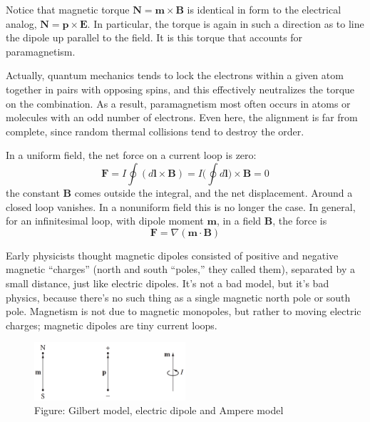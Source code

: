 \documentclass[../../../main.tex]{subfiles}
\begin{document}
Notice that magnetic torque $ \mathbf{N}=\mathbf{m}\times\mathbf{B}$ is identical in form to the electrical analog, $\mathbf{N} = \mathbf{p} \times \mathbf{E}$. In particular, the torque is again in such a direction as to line the dipole up parallel to the ﬁeld. It is this torque that accounts for paramagnetism.

Actually, quantum mechanics tends to lock the electrons within a given atom together in pairs with opposing spins, and this effectively neutralizes the torque on the combination. As a result, paramagnetism most often occurs in atoms or molecules with an odd number of electrons. Even here, the alignment is far from complete, since random thermal collisions tend to destroy the order.

In a uniform ﬁeld, the net force on a current loop is zero:
\begin{equation*}
    \mathbf{F}=I\oint (d\mathbf{l}\times \mathbf{B})=I\biggl(\oint d\mathbf{l}\biggr)\times \mathbf{B}=0
\end{equation*}
the constant \textbf{B} comes outside the integral, and the net displacement. Around a closed loop vanishes. In a nonuniform ﬁeld this is no longer the case. In general, for an inﬁnitesimal loop, with dipole moment $\mathbf{m}$, in a ﬁeld \textbf{B}, the force is
\begin{equation*}
    \mathbf{F}=\nabla(\mathbf{m}\cdot\mathbf{B})
\end{equation*}

Early physicists thought magnetic dipoles consisted of positive and negative magnetic “charges” (north and south “poles,” they called them), separated by a small distance, just like electric dipoles. It’s not a bad model, but it’s bad physics, because there’s no such thing as a single magnetic north pole or south pole. Magnetism is not due to magnetic monopoles, but rather to moving electric charges; magnetic dipoles are tiny current loops.
\begin{figure}
    \centering
    \includegraphics[width=0.5\textwidth]{../Rss/Electromagnetism/FieldInsideMatter/DipModel.png}
    \caption*{Figure: Gilbert model, electric dipole and Ampere model}
\end{figure}
\end{document}
